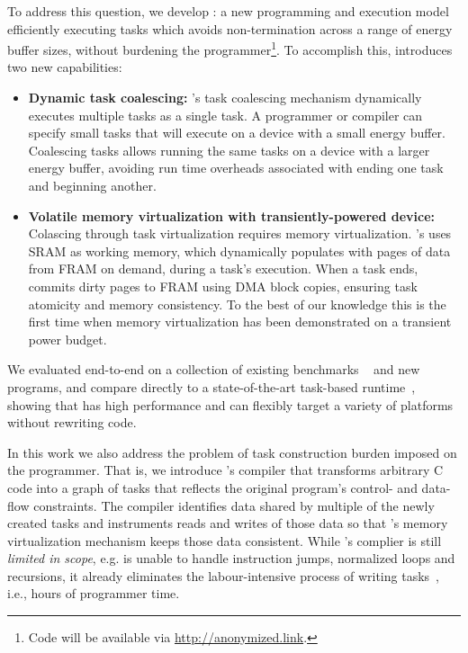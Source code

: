 To address this question, we develop {\bf \sys}: a new programming and execution model efficiently executing tasks which avoids non-termination across a range of energy buffer sizes, without burdening the programmer\footnote{Code will be available via \href{http://anonymized.link}{http://anonymized.link}.}. To accomplish this, \sys introduces two new capabilities: 

\begin{itemize}
	\item {\bf Dynamic task coalescing:} \sys's task coalescing mechanism dynamically executes multiple tasks as a single task. A programmer or compiler can specify small tasks that will execute on a device with a small energy buffer. Coalescing tasks allows running the same tasks on a device with a larger energy buffer, avoiding run time overheads associated with ending one task and beginning another.
	\item {\bf Volatile memory virtualization with transiently-powered device:} Colascing through task virtualization requires memory virtualization. \sys's uses SRAM as working memory, which \sys dynamically populates with pages of data from FRAM on demand, during a task's execution. When a task ends, \sys commits dirty pages to FRAM using DMA block copies, ensuring task atomicity and memory consistency. To the best of our knowledge this is the first time when memory virtualization has been demonstrated on a transient power budget.
\end{itemize}

We evaluated \sys end-to-end on a collection of existing benchmarks ~\cite{chain} and new programs, and compare directly to a state-of-the-art task-based runtime~\cite{chain}, showing that \sys has high performance and can flexibly target a variety of platforms without rewriting code. 

In this work we also address the problem of task construction burden imposed on the programmer. That is, we introduce \sys's compiler that transforms arbitrary C code into a graph of tasks that reflects the original program's control- and data-flow constraints. The compiler identifies data shared by multiple of the newly created tasks and instruments reads and writes of those data so that \sys's memory virtualization mechanism keeps those data consistent. While \sys's complier is still \emph{limited in scope}, e.g. is unable to handle instruction jumps, normalized loops and recursions, it already eliminates the labour-intensive process of writing tasks~\cite{chain,alpaca}, i.e., hours of programmer time.

